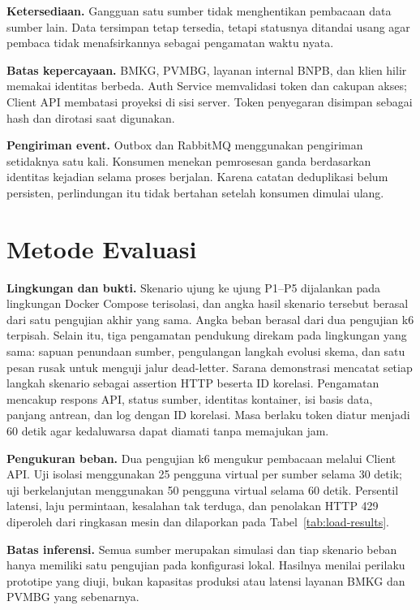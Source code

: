\documentclass{fairmeta}
\begin{document}
\textbf{Ketersediaan.} Gangguan satu sumber tidak menghentikan pembacaan data sumber lain. Data tersimpan tetap tersedia, tetapi statusnya ditandai usang agar pembaca tidak menafsirkannya sebagai pengamatan waktu nyata.


\textbf{Batas kepercayaan.} BMKG, PVMBG, layanan internal BNPB, dan klien hilir memakai identitas berbeda. Auth Service memvalidasi token dan cakupan akses; Client API membatasi proyeksi di sisi server. Token penyegaran disimpan sebagai hash dan dirotasi saat digunakan.


\textbf{Pengiriman event.} Outbox dan RabbitMQ menggunakan pengiriman setidaknya satu kali. Konsumen menekan pemrosesan ganda berdasarkan identitas kejadian selama proses berjalan. Karena catatan deduplikasi belum persisten, perlindungan itu tidak bertahan setelah konsumen dimulai ulang.

\section{Metode Evaluasi}

\textbf{Lingkungan dan bukti.} Skenario ujung ke ujung P1--P5 dijalankan pada lingkungan Docker Compose terisolasi, dan angka hasil skenario tersebut berasal dari satu pengujian akhir yang sama. Angka beban berasal dari dua pengujian k6 terpisah. Selain itu, tiga pengamatan pendukung direkam pada lingkungan yang sama: sapuan penundaan sumber, pengulangan langkah evolusi skema, dan satu pesan rusak untuk menguji jalur dead-letter. Sarana demonstrasi mencatat setiap langkah skenario sebagai assertion HTTP beserta ID korelasi. Pengamatan mencakup respons API, status sumber, identitas kontainer, isi basis data, panjang antrean, dan log dengan ID korelasi. Masa berlaku token diatur menjadi 60 detik agar kedaluwarsa dapat diamati tanpa memajukan jam.

\textbf{Pengukuran beban.} Dua pengujian k6 mengukur pembacaan melalui Client API. Uji isolasi menggunakan 25 pengguna virtual per sumber selama 30 detik; uji berkelanjutan menggunakan 50 pengguna virtual selama 60 detik. Persentil latensi, laju permintaan, kesalahan tak terduga, dan penolakan HTTP 429 diperoleh dari ringkasan mesin dan dilaporkan pada Tabel~\ref{tab:load-results}.

\textbf{Batas inferensi.} Semua sumber merupakan simulasi dan tiap skenario beban hanya memiliki satu pengujian pada konfigurasi lokal. Hasilnya menilai perilaku prototipe yang diuji, bukan kapasitas produksi atau latensi layanan BMKG dan PVMBG yang sebenarnya.
\end{document}
